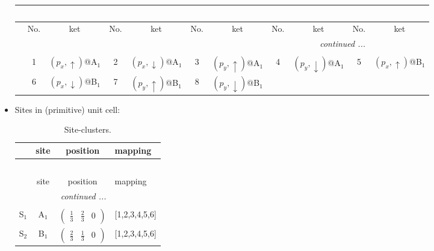 \documentclass[fleqn,10pt,landscape]{article}
\begin{document}
\begin{itemize}
\begin{center}
\begin{longtable}{c|cc|cc|cc|cc|cc}
\multicolumn{10}{l}{\tablename\ \thetable{}} \\
 \hline \hline
 & No. & ket & No. & ket & No. & ket & No. & ket & No. & ket \\ \hline \endhead

 \hline \hline
\multicolumn{10}{r}{\footnotesize\it continued ...} \\ \endfoot

 \hline \hline
\multicolumn{10}{r}{} \\ \endlastfoot

 & 1 & $(p_{x},\uparrow)$@A$_{1}$ & 2 & $(p_{x},\downarrow)$@A$_{1}$ & 3 & $(p_{y},\uparrow)$@A$_{1}$ & 4 & $(p_{y},\downarrow)$@A$_{1}$ & 5 & $(p_{x},\uparrow)$@B$_{1}$ \\
& 6 & $(p_{x},\downarrow)$@B$_{1}$ & 7 & $(p_{y},\uparrow)$@B$_{1}$ & 8 & $(p_{y},\downarrow)$@B$_{1}$ &  &  &  &  \\
\end{longtable}
\end{center}

\item Sites in (primitive) unit cell:
\begin{center}
\renewcommand{\arraystretch}{1.3}
\begin{longtable}{cc|c|l}
\caption{Site-clusters.}
 \\
 \hline \hline
 & site & position & mapping \\ \hline \endfirsthead

\multicolumn{3}{l}{\tablename\ \thetable{}} \\
 \hline \hline
 & site & position & mapping \\ \hline \endhead

 \hline \hline
\multicolumn{3}{r}{\footnotesize\it continued ...} \\ \endfoot

 \hline \hline
\multicolumn{3}{r}{} \\ \endlastfoot

S$_{1}$ & A$_1$ & $\begin{pmatrix} \frac{1}{3} & \frac{2}{3} & 0 \end{pmatrix}$ & [1,2,3,4,5,6] \\ \hline
S$_{2}$ & B$_1$ & $\begin{pmatrix} \frac{2}{3} & \frac{1}{3} & 0 \end{pmatrix}$ & [1,2,3,4,5,6] \\
\end{longtable}
\end{center}


\end{itemize}
\end{document}
